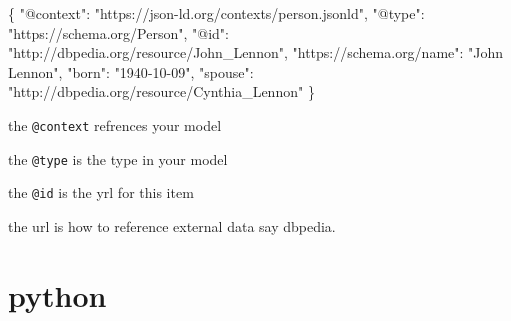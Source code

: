 \documentclass[
  letterpaper,
  DIV=11,
  numbers=noendperiod]{scrartcl}
\newenvironment{Shaded}{\begin{snugshade}}{\end{snugshade}}
\newcommand{\NormalTok}[1]{\textcolor[rgb]{0.00,0.23,0.31}{#1}}
\newcommand{\StringTok}[1]{\textcolor[rgb]{0.13,0.47,0.30}{#1}}
\providecommand{\tightlist}{%
  \setlength{\itemsep}{0pt}\setlength{\parskip}{0pt}}\usepackage{longtable,booktabs,array}
\begin{document}
\hypertarget{annotated-cell-1}{%
\label{annotated-cell-1}}%
\begin{Shaded}
\begin{Highlighting}[]

\NormalTok{\{}
  \StringTok{"@context"}\NormalTok{: }\StringTok{"https://json{-}ld.org/contexts/person.jsonld"}\NormalTok{,}\hspace*{\fill}\NormalTok{}
  \StringTok{"@type"}\NormalTok{: }\StringTok{"https://schema.org/Person"}\NormalTok{,}\hspace*{\fill}\NormalTok{}
  \StringTok{"@id"}\NormalTok{: }\StringTok{"http://dbpedia.org/resource/John\_Lennon"}\NormalTok{,}\hspace*{\fill}\NormalTok{}
  \StringTok{"https://schema.org/name"}\NormalTok{: }\StringTok{"John Lennon"}\NormalTok{,}
  \StringTok{"born"}\NormalTok{: }\StringTok{"1940{-}10{-}09"}\NormalTok{,}
  \StringTok{"spouse"}\NormalTok{: }\StringTok{"http://dbpedia.org/resource/Cynthia\_Lennon"}\hspace*{\fill}\NormalTok{}
\NormalTok{\}}
\end{Highlighting}
\end{Shaded}

\begin{description}
\tightlist
\item[\circled{1}]
the \texttt{@context} refrences your model
\item[\circled{2}]
the \texttt{@type} is the type in your model
\item[\circled{3}]
the \texttt{@id} is the yrl for this item
\item[\circled{4}]
the url is how to reference external data say dbpedia.
\end{description}

\hypertarget{python}{%
\section{python}\label{python}}
\end{document}

